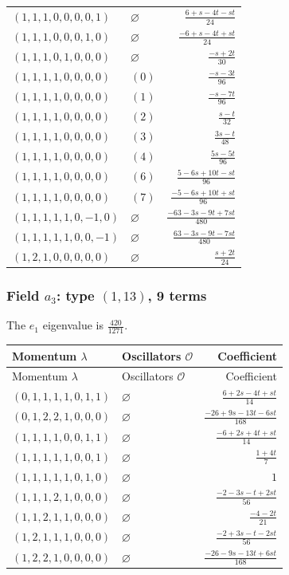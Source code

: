 \begin{longtable}{@{}llr@{}}
$(1,1,1,0,0,0,0,1)$ & $\varnothing$ & $\frac{6+s-4t-st}{24}$\\
$(1,1,1,0,0,0,1,0)$ & $\varnothing$ & $\frac{-6+s-4t+st}{24}$\\
$(1,1,1,0,1,0,0,0)$ & $\varnothing$ & $\frac{-s+2t}{30}$\\
$(1,1,1,1,0,0,0,0)$ & $(0)$ & $\frac{-s-3t}{96}$\\
$(1,1,1,1,0,0,0,0)$ & $(1)$ & $\frac{-s-7t}{96}$\\
$(1,1,1,1,0,0,0,0)$ & $(2)$ & $\frac{s-t}{32}$\\
$(1,1,1,1,0,0,0,0)$ & $(3)$ & $\frac{3s-t}{48}$\\
$(1,1,1,1,0,0,0,0)$ & $(4)$ & $\frac{5s-5t}{96}$\\
$(1,1,1,1,0,0,0,0)$ & $(6)$ & $\frac{5-6s+10t-st}{96}$\\
$(1,1,1,1,0,0,0,0)$ & $(7)$ & $\frac{-5-6s+10t+st}{96}$\\
$(1,1,1,1,1,0,-1,0)$ & $\varnothing$ & $\frac{-63-3s-9t+7st}{480}$\\
$(1,1,1,1,1,0,0,-1)$ & $\varnothing$ & $\frac{63-3s-9t-7st}{480}$\\
$(1,2,1,0,0,0,0,0)$ & $\varnothing$ & $\frac{s+2t}{24}$\\
\end{longtable}
\endgroup
\subsubsection{\texorpdfstring{Field $a_{3}$: type $(1,13)$, 9 terms}{Field a3: type (1,13), 9 terms}}
The $e_1$ eigenvalue is $\frac{420}{1271}$. 
\begingroup\scriptsize\setlength{\tabcolsep}{3pt}\renewcommand{\arraystretch}{1.35}
\begin{longtable}{@{}llr@{}}
\toprule Momentum $\lambda$&Oscillators $\mathcal O$&Coefficient\\\midrule\endfirsthead
\toprule Momentum $\lambda$&Oscillators $\mathcal O$&Coefficient\\\midrule\endhead
\bottomrule\endfoot
$(0,1,1,1,1,0,1,1)$ & $\varnothing$ & $\frac{6+2s-4t+st}{14}$\\
$(0,1,2,2,1,0,0,0)$ & $\varnothing$ & $\frac{-26+9s-13t-6st}{168}$\\
$(1,1,1,1,0,0,1,1)$ & $\varnothing$ & $\frac{-6+2s+4t+st}{14}$\\
$(1,1,1,1,1,0,0,1)$ & $\varnothing$ & $\frac{1+4t}{7}$\\
$(1,1,1,1,1,0,1,0)$ & $\varnothing$ & $1$\\
$(1,1,1,2,1,0,0,0)$ & $\varnothing$ & $\frac{-2-3s-t+2st}{56}$\\
$(1,1,2,1,1,0,0,0)$ & $\varnothing$ & $\frac{-4-2t}{21}$\\
$(1,2,1,1,1,0,0,0)$ & $\varnothing$ & $\frac{-2+3s-t-2st}{56}$\\
$(1,2,2,1,0,0,0,0)$ & $\varnothing$ & $\frac{-26-9s-13t+6st}{168}$\\
\end{longtable}
\endgroup
